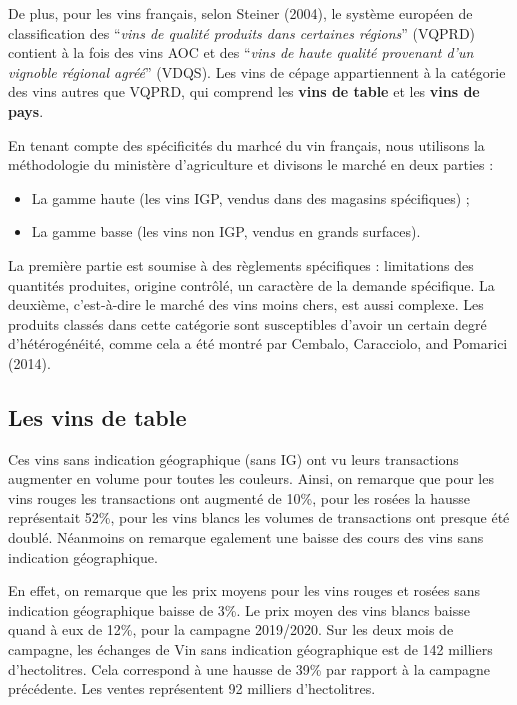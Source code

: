 \documentclass[11pt,]{article}
\providecommand{\tightlist}{%
  \setlength{\itemsep}{0pt}\setlength{\parskip}{0pt}}
\begin{document}
De plus, pour les vins français, selon Steiner (2004), le système
européen de classification des ``\emph{vins de qualité produits dans
certaines régions}'' (VQPRD) contient à la fois des vins AOC et des
``\emph{vins de haute qualité provenant d'un vignoble régional agréé}''
(VDQS). Les vins de cépage appartiennent à la catégorie des vins autres
que VQPRD, qui comprend les \textbf{vins de table} et les
\textbf{vins de pays}.

En tenant compte des spécificités du marhcé du vin français, nous
utilisons la méthodologie du ministère d'agriculture et divisons le
marché en deux parties :

\begin{itemize}
\tightlist
\item
  La gamme haute (les vins IGP, vendus dans des magasins spécifiques) ;
\item
  La gamme basse (les vins non IGP, vendus en grands surfaces).
\end{itemize}

La première partie est soumise à des règlements spécifiques :
limitations des quantités produites, origine contrôlé, un caractère de
la demande spécifique. La deuxième, c'est-à-dire le marché des vins
moins chers, est aussi complexe. Les produits classés dans cette
catégorie sont susceptibles d'avoir un certain degré d'hétérogénéité,
comme cela a été montré par Cembalo, Caracciolo, and Pomarici (2014).

\hypertarget{les-vins-de-table}{%
\subsection{Les vins de table}\label{les-vins-de-table}}

Ces vins sans indication géographique (sans IG) ont vu leurs
transactions augmenter en volume pour toutes les couleurs. Ainsi, on
remarque que pour les vins rouges les transactions ont augmenté de 10\%,
pour les rosées la hausse représentait 52\%, pour les vins blancs les
volumes de transactions ont presque été doublé. Néanmoins on remarque
egalement une baisse des cours des vins sans indication géographique.

En effet, on remarque que les prix moyens pour les vins rouges et rosées
sans indication géographique baisse de 3\%. Le prix moyen des vins
blancs baisse quand à eux de 12\%, pour la campagne 2019/2020. Sur les
deux mois de campagne, les échanges de Vin sans indication géographique
est de 142 milliers d'hectolitres. Cela correspond à une hausse de 39\%
par rapport à la campagne précédente. Les ventes représentent 92
milliers d'hectolitres.
\end{document}
